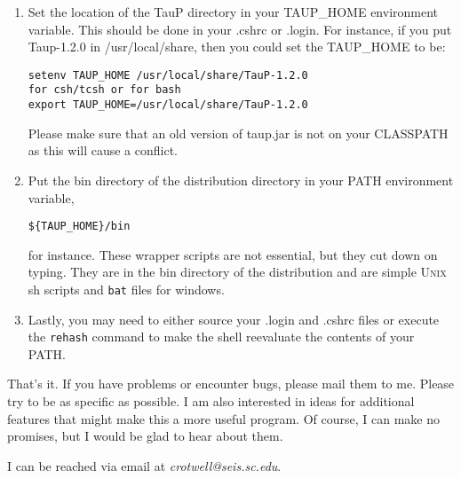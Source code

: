\begin{enumerate}
\item Set the location of the TauP directory in your TAUP\_HOME environment variable.
This should be done in your .cshrc or .login. For instance, if you put Taup-1.2.0 in
/usr/local/share, then you could set the TAUP\_HOME to be:
\begin{verbatim}
setenv TAUP_HOME /usr/local/share/TauP-1.2.0
for csh/tcsh or for bash
export TAUP_HOME=/usr/local/share/TauP-1.2.0
\end{verbatim} 

Please make sure that an old version of taup.jar is not on your CLASSPATH as this will cause a 
conflict.

\item Put the bin directory of the distribution directory in your PATH environment
variable, \begin{verbatim}${TAUP_HOME}/bin\end{verbatim} for instance. These wrapper 
scripts are not essential, but they cut down on 
typing. They are in the bin directory of the distribution 
and are simple \textsc{Unix} sh scripts and \texttt{bat} files for windows.

\item Lastly, you may need to either source your .login and .cshrc files or
execute the \texttt{rehash} command to make the shell reevaluate the 
contents of your PATH.

\end{enumerate}

That's it. If you have problems or encounter bugs, please mail them to me.
Please try to be as specific as possible. I am also interested in ideas for
additional features that might make this a more useful program. 
Of course, I can make no promises,
but I would be glad to hear about them.

I can be reached via email at \textit{crotwell@seis.sc.edu}.


